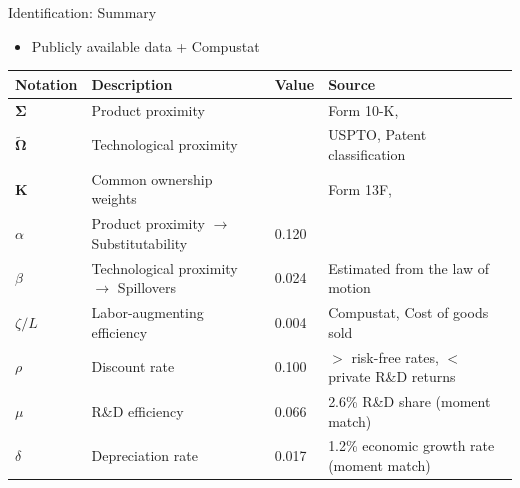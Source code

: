 \documentclass[
  10pt,
  aspectratio=169,   %
]{beamer}
\theoremstyle{plain}
\begin{document}
\begin{frame}{Identification: Summary}
  \begin{itemize}
    \item Publicly available data + Compustat
  \end{itemize}
  \begin{table}[h]
    \centering
    \small %
    \begin{tabular}{llll}
      \toprule
      Notation                  & Description                                      & Value & Source                                        \\
      \midrule
      $\bm{\Sigma}$             & Product proximity                                &       & Form 10-K, \citet{Hoberg2016-jm}              \\
      $\bm{\widetilde{\Omega}}$ & Technological proximity                          &       & USPTO, Patent classification                  \\
      $\bm{K}$                  & Common ownership weights                         &       & Form 13F, \citet{Backus2021-yt}               \\
      $\alpha$                  & Product proximity $\rightarrow$ Substitutability & 0.120 & \citet{Pellegrino2024-dn}                     \\
      $\beta$                   & Technological proximity $\rightarrow$ Spillovers & 0.024 & Estimated from the law of motion              \\
      $\zeta/L$                 & Labor-augmenting efficiency                      & 0.004 & Compustat, Cost of goods sold                 \\
      $\rho$                    & Discount rate                                    & 0.100 & $>$ risk-free rates, $<$ private R\&D returns \\
      $\mu$                     & R\&D efficiency                                  & 0.066 & 2.6\% R\&D share (moment match)               \\
      $\delta$                  & Depreciation rate                                & 0.017 & 1.2\% economic growth rate (moment match)     \\
      \bottomrule
    \end{tabular}
  \end{table}
\end{frame}
\end{document}
